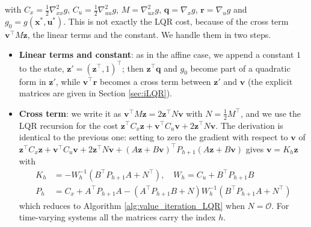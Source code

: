 \documentclass[10pt, a4paper]{report}
\begin{document}
with $C_x=\frac12\nabla^2_{xx}g$, $C_u=\frac12\nabla^2_{uu}g$, $M=\nabla^2_{ux}g$, $\mathbf q=\nabla_xg$, $\mathbf r=\nabla_ug$ and $g_0=g(\mathbf x^*,\mathbf u^*)$. This is not exactly the LQR cost, because of the cross term $\mathbf v^\top M\mathbf z$, the linear terms and the constant. We handle them in two steps.\begin{itemize}
    \item \textbf{Linear terms and constant}: as in the affine case, we append a constant $1$ to the state, $\mathbf z'=(\mathbf z^\top,1)^\top$; then $\mathbf z^\top\mathbf q$ and $g_0$ become part of a quadratic form in $\mathbf z'$, while $\mathbf v^\top\mathbf r$ becomes a cross term between $\mathbf z'$ and $\mathbf v$ (the explicit matrices are given in Section \ref{sec:iLQR}).
    \item \textbf{Cross term}: we write it as $\mathbf v^\top M\mathbf z=2\mathbf z^\top N\mathbf v$ with $N=\frac12M^\top$, and we use the LQR recursion for the cost $\mathbf z^\top C_x\mathbf z+\mathbf v^\top C_u\mathbf v+2\mathbf z^\top N\mathbf v$. The derivation is identical to the previous one: setting to zero the gradient with respect to $\mathbf v$ of $\mathbf z^\top C_x\mathbf z+\mathbf v^\top C_u\mathbf v+2\mathbf z^\top N\mathbf v+(A\mathbf z+B\mathbf v)^\top P_{h+1}(A\mathbf z+B\mathbf v)$ gives $\mathbf v=K_h\mathbf z$ with\begin{align}
        K_h&=-W_h^{-1}\left(B^\top P_{h+1}A+N^\top\right), \quad W_h=C_u+B^\top P_{h+1}B\\
        P_h&=C_x+A^\top P_{h+1}A-\left(A^\top P_{h+1}B+N\right)W_h^{-1}\left(B^\top P_{h+1}A+N^\top\right)
    \end{align}
    which reduces to Algorithm \ref{alg:value_iteration_LQR} when $N=\mathcal O$. For time-varying systems all the matrices carry the index $h$.
\end{itemize}
\end{document}
